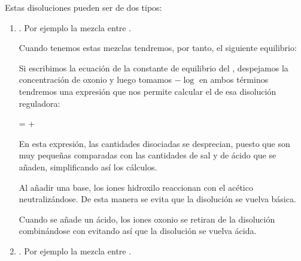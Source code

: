 Estas disoluciones pueden ser de dos tipos:
\begin{enumerate}[label=\numberballmDarkTeal]
        \item {}.
        Por ejemplo la mezcla entre .

        Cuando tenemos estas mezclas tendremos, por tanto, el siguiente equilibrio:
\begin{centeredequation}
\end{centeredequation}


        Si escribimos la ecuación de la constante de equilibrio del , despejamos la concentración de oxonio y luego tomamos \( -\log  \) en ambos términos tendremos una expresión que nos permite calcular el \pH{} de esa disolución reguladora:



        \begin{centeredequation}
            \pH = \pKa + \log{}
        \end{centeredequation}

        En esta expresión, las cantidades disociadas se desprecian, puesto que son muy pequeñas comparadas con las cantidades de sal y de ácido que se añaden, simplificando así los cálculos.

        Al añadir una base, los iones hidroxilo reaccionan con el acético neutralizándose.
        De esta manera se evita que la disolución se vuelva básica.
        \begin{centeredequation}
        \end{centeredequation}
        Cuando se añade un ácido, los iones oxonio se retiran de la disolución combinándose con  evitando así que la disolución se vuelva ácida.
        \begin{centeredequation}
        \end{centeredequation}
        \item {}.
        Por ejemplo la mezcla entre .


\end{enumerate}
